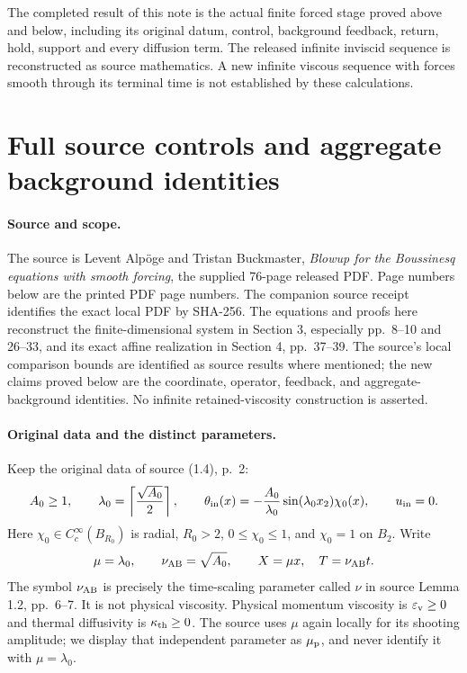 The completed result of this note is the actual finite forced
stage proved above and below, including its original datum,
control, background feedback, return, hold, support and every
diffusion term. The released infinite inviscid sequence is
reconstructed as source mathematics. A new infinite viscous
sequence with forces smooth through its terminal time is not
established by these calculations.




\section{Full source controls and aggregate background identities}
\paragraph{Source and scope.}
The source is Levent Alp\"oge and Tristan Buckmaster, \emph{Blowup for the Boussinesq equations with smooth forcing}, the supplied 76-page released PDF. Page numbers below are the printed PDF page numbers. The companion source receipt identifies the exact local PDF by SHA-256. The equations and proofs here reconstruct the finite-dimensional system in Section 3, especially pp.~8--10 and 26--33, and its exact affine realization in Section 4, pp.~37--39. The source's local comparison bounds are identified as source results where mentioned; the new claims proved below are the coordinate, operator, feedback, and aggregate-background identities. No infinite retained-viscosity construction is asserted.

\paragraph{Original data and the distinct parameters.}
Keep the original data of source (1.4), p.~2:
\[
 A_0\ge1,\qquad \lambda_0=\left\lceil\frac{\sqrt{A_0}}2\right\rceil,
 \qquad \theta_{\rm in}(x)=-\frac{A_0}{\lambda_0}\sin(\lambda_0x_2)\chi_0(x),
 \qquad u_{\rm in}=0.
\]
Here $\chi_0\in C_c^\infty(B_{R_0})$ is radial, $R_0>2$, $0\le\chi_0\le1$, and $\chi_0=1$ on $B_2$. Write
\[
 \mu=\lambda_0,\qquad \nu_{\mathrm{AB}}=\sqrt{A_0},\qquad X=\mu x,\quad T=\nu_{\mathrm{AB}}t.
\]
The symbol $\nu_{\mathrm{AB}}$ is precisely the time-scaling parameter called $\nu$ in source Lemma 1.2, pp.~6--7. It is not physical viscosity. Physical momentum viscosity is $\varepsilon_{\mathrm v}\ge0$ and thermal diffusivity is $\kappa_{\mathrm{th}}\ge0$. The source uses $\mu$ again locally for its shooting amplitude; we display that independent parameter as $\mu_{\rm p}$, and never identify it with $\mu=\lambda_0$.

